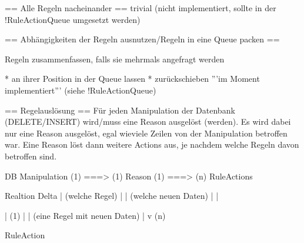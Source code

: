 == Alle Regeln nacheinander ==
trivial (nicht implementiert, sollte in der !RuleActionQueue umgesetzt werden)

== Abhängigkeiten der Regeln ausnutzen/Regeln in eine Queue packen ==

Regeln zusammenfassen, falls sie mehrmals angefragt werden

 * an ihrer Position in der Queue lassen
 * zurückschieben '''im Moment implementiert''' (siehe !RuleActionQueue)

== Regelauslösung ==
Für jeden Manipulation der Datenbank (DELETE/INSERT) wird/muss eine Reason ausgelöst (werden). Es wird dabei nur eine Reason ausgelöst, egal wieviele Zeilen von der Manipulation betroffen war. Eine Reason löst dann weitere Actions aus, je nachdem welche Regeln davon betroffen sind.


DB Manipulation  (1) ===> (1) Reason (1) ===> (n) RuleActions

           Realtion                     Delta
                                          |
(welche Regel) |                          | (welche neuen Daten)
               |                          |

                          | (1)
                          |
                          | (eine Regel mit neuen Daten)
                          |
                          v (n)

                      RuleAction




